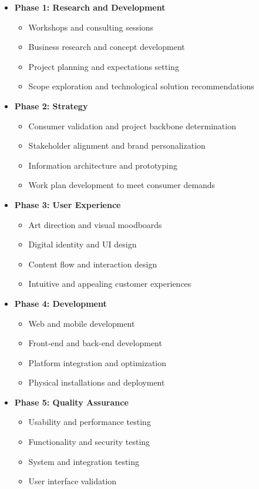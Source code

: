 \documentclass[12pt,a4paper]{article}
\begin{document}
\begin{itemize}
    \item \textbf{Phase 1: Research and Development}
    \begin{itemize}
        \item Workshops and consulting sessions
        \item Business research and concept development
        \item Project planning and expectations setting
        \item Scope exploration and technological solution recommendations
    \end{itemize}

    \clearpage
    \item \textbf{Phase 2: Strategy}
    \begin{itemize}
        \item Consumer validation and project backbone determination
        \item Stakeholder alignment and brand personalization
        \item Information architecture and prototyping
        \item Work plan development to meet consumer demands
    \end{itemize}
    
    \item \textbf{Phase 3: User Experience}
    \begin{itemize}
        \item Art direction and visual moodboards
        \item Digital identity and UI design
        \item Content flow and interaction design
        \item Intuitive and appealing customer experiences
    \end{itemize}
    
    \item \textbf{Phase 4: Development}
    \begin{itemize}
        \item Web and mobile development
        \item Front-end and back-end development
        \item Platform integration and optimization
        \item Physical installations and deployment
    \end{itemize}
    
    \item \textbf{Phase 5: Quality Assurance}
    \begin{itemize}
        \item Usability and performance testing
        \item Functionality and security testing
        \item System and integration testing
        \item User interface validation
    \end{itemize}
    

\end{itemize}
\end{document}
